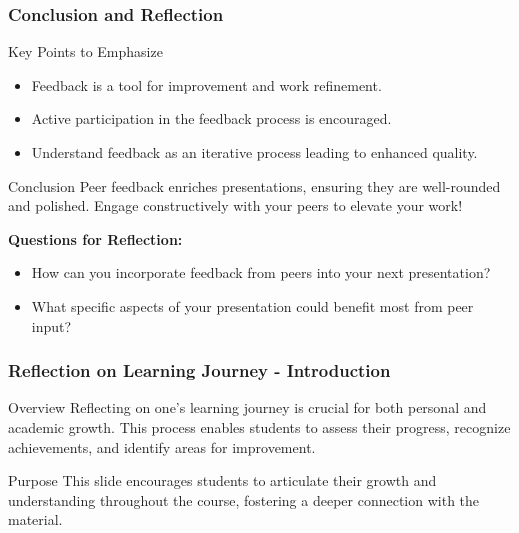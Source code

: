\documentclass{beamer}
\begin{document}
\begin{frame}[fragile]
    \frametitle{Conclusion and Reflection}
    \begin{block}{Key Points to Emphasize}
        \begin{itemize}
            \item Feedback is a tool for improvement and work refinement.
            \item Active participation in the feedback process is encouraged.
            \item Understand feedback as an iterative process leading to enhanced quality.
        \end{itemize}
    \end{block}

    \begin{block}{Conclusion}
        Peer feedback enriches presentations, ensuring they are well-rounded and polished. Engage constructively with your peers to elevate your work!
    \end{block}

    \textbf{Questions for Reflection:}
    \begin{itemize}
        \item How can you incorporate feedback from peers into your next presentation?
        \item What specific aspects of your presentation could benefit most from peer input?
    \end{itemize}
\end{frame}

\begin{frame}[fragile]
    \frametitle{Reflection on Learning Journey - Introduction}
    \begin{block}{Overview}
        Reflecting on one's learning journey is crucial for both personal and academic growth. 
        This process enables students to assess their progress, recognize achievements, and identify areas for improvement.
    \end{block}
    \begin{block}{Purpose}
        This slide encourages students to articulate their growth and understanding throughout the course, fostering a deeper connection with the material.
    \end{block}
\end{frame}
\end{document}
